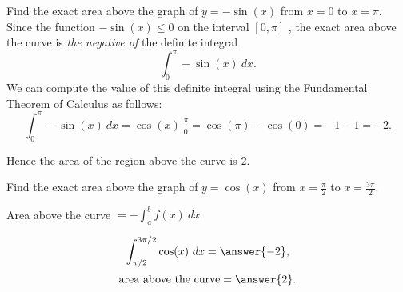 \documentclass{ximera}
\begin{document}
\begin{example}
Find the exact area above the graph of $y = -\sin(x)$ from $x = 0$ to $x = \pi$. \\
Since the function $-\sin(x) \leq 0$ on the interval $[0, \pi]$ , the exact area above the curve is \textit{the negative of} the definite integral 
\[\int_{0}^\pi -\sin(x) \ dx.\]
We can compute the value of this definite integral using the Fundamental Theorem of Calculus as follows:
\[\int_0^\pi -\sin(x) \ dx = \cos(x) \Big|_{0}^\pi = \cos(\pi) - \cos(0) = -1 -1 = -2.\]

Hence the area of the region above the curve is $2$.


\begin{image}
\end{image}
\end{example}

\begin{problem}
Find the exact area above the graph of $y = \cos(x)$ from $x = \frac{\pi}{2}$ to $x = \frac{3\pi}{2}$. \\
\begin{hint}
Area above the curve $= -\int_a^b f(x) \ dx$
\end{hint}
\[\int_{\pi/2}^{3\pi/2} \cos(x) \ dx = \answer{-2},\]
\[\text{area above the curve} = \answer{2}.\]
\end{problem}
\end{document}
